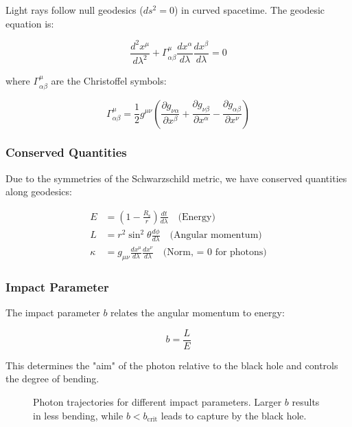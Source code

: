 \documentclass[12pt,a4paper]{article}
\theoremstyle{definition}
\theoremstyle{remark}
\newcommand{\Rs}{R_{\text{s}}}
\begin{document}
Light rays follow null geodesics ($ds^2 = 0$) in curved spacetime. The geodesic equation is:

\begin{equation}
    \frac{d^2x^\mu}{d\lambda^2} + \Gamma^\mu_{\alpha\beta}\frac{dx^\alpha}{d\lambda}\frac{dx^\beta}{d\lambda} = 0
\end{equation}

where $\Gamma^\mu_{\alpha\beta}$ are the Christoffel symbols:

\begin{equation}
    \Gamma^\mu_{\alpha\beta} = \frac{1}{2}g^{\mu\nu}\left(\frac{\partial g_{\nu\alpha}}{\partial x^\beta} + \frac{\partial g_{\nu\beta}}{\partial x^\alpha} - \frac{\partial g_{\alpha\beta}}{\partial x^\nu}\right)
\end{equation}

\subsubsection{Conserved Quantities}

Due to the symmetries of the Schwarzschild metric, we have conserved quantities along geodesics:

\begin{align}
    E &= \left(1 - \frac{\Rs}{r}\right)\frac{dt}{d\lambda} \quad \text{(Energy)} \\
    L &= r^2\sin^2\theta\frac{d\phi}{d\lambda} \quad \text{(Angular momentum)} \\
    \kappa &= g_{\mu\nu}\frac{dx^\mu}{d\lambda}\frac{dx^\nu}{d\lambda} \quad \text{(Norm, = 0 for photons)}
\end{align}

\subsubsection{Impact Parameter}

The impact parameter $b$ relates the angular momentum to energy:

\begin{equation}
    b = \frac{L}{E}
\end{equation}

This determines the "aim" of the photon relative to the black hole and controls the degree of bending.

\begin{figure}[H]
    \centering
    \caption{Photon trajectories for different impact parameters. Larger $b$ results in less bending, while $b < b_{\text{crit}}$ leads to capture by the black hole.}
    \label{fig:impact_parameter}
\end{figure}
\end{document}
